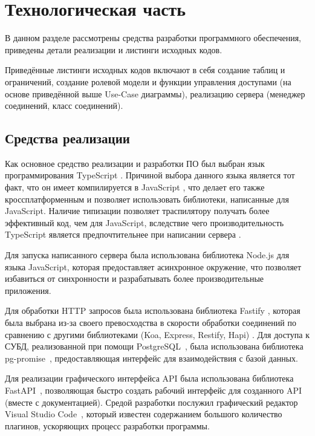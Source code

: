 \section{\large Технологическая часть}

В  данном  разделе  рассмотрены  средства  разработки  программного
обеспечения, приведены детали реализации и листинги исходных кодов.

Приведённые листинги исходных кодов включают в себя создание таблиц и ограничений, создание ролевой модели и функции управления доступами (на основе приведённой выше Use-Case диаграммы), реализацию сервера (менеджер соединений, класс соединений).

\subsection{Средства реализации}
Как  основное  средство  реализации  и  разработки  ПО  был  выбран  язык
программирования  TypeScript \cite{ts}.
Причиной  выбора  данного  языка  является  тот факт,  что  он  имеет компилируется в JavaScript \cite{js}, что делает его также кроссплатформенным и позволяет использовать библиотеки, написанные для JavaScript.
Наличие типизации позволяет траспилятору получать более эффективный код, чем для JavaScript, вследствие чего производительность TypeScript является предпочтительнее при написании сервера \cite{ts-vs-js}.

Для запуска написанного сервера была использована библиотека Node.js \cite{nodejs} для языка JavaScript, которая предоставляет асинхронное окружение, что позволяет избавиться от синхронности и разрабатывать более производительные приложения.

Для обработки HTTP запросов была использована библиотека Fastify \cite{fastify}, которая была выбрана из-за своего превосходства в скорости обработки соединений по сравнению с другими библиотеками (Koa, Express, Restify, Hapi) \cite{fastify-b}.
Для доступа к СУБД, реализованной при помощи PostgreSQL~\cite{postgres}, была использована библиотека pg-promise~\cite{pg-promise}, предоставляющая интерфейс для взаимодействия с базой данных.

Для реализации графического интерфейса API была использована библиотека FastAPI~\cite{fastapi}, позволяющая быстро создать рабочий интерфейс для созданного API (вместе с документацией).
Средой разработки  послужил  графический  редактор  Visual  Studio  Code~\cite{vscode},  который известен  содержанием  большого  количество  плагинов,  ускоряющих  процесс разработки  программы.


